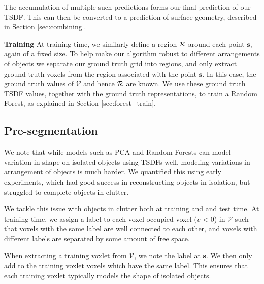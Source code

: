 \documentclass[10pt,twocolumn,letterpaper]{article}
\newcommand{\pixelidx}{\mathbf{s}}
\newcommand{\voxelgrid}{\mathcal{V}}
\newcommand{\voxel}{v}
\newcommand{\note}[1]{\textcolor{blue}{NOTE: #1}}
\renewcommand{\paragraph}{\vspace{2pt}\noindent\textbf}
\begin{document}
The accumulation of multiple such predictions forms our final prediction of our TSDF.
This can then be converted to a prediction of surface geometry, described in Section \ref{sec:combining}.



\paragraph{Training}
At training time, we similarly define a region $\mathcal{R}$ around each point $\pixelidx$, again of a fixed size.
To help make our algorithm robust to different arrangements of objects we separate our ground truth grid into regions, and only extract ground truth voxels from the region associated with the point $\pixelidx$.
In this case, the ground truth values of $\voxelgrid$ and hence $\mathcal{R}$ are known.
We use these ground truth TSDF values, together with the ground truth representations, to train a Random Forest, as explained in  Section \ref{sec:forest_train}.


\subsection{Pre-segmentation}

We note that while models such as PCA and Random Forests can model variation in shape on isolated objects using TSDFs well, modeling variations in arrangement of objects is much harder.
We quantified this using early experiments, which had good success in reconstructing objects in isolation, but struggled to complete objects in clutter.

We tackle this issue with objects in clutter both at training and and test time.
At training time, we assign a label to each voxel occupied voxel ($\voxel$ < 0) in $\voxelgrid$ such that  voxels with the same label are well connected to each other, and voxels with different labels are separated by some amount of free space.

When extracting a training voxlet from $\voxelgrid$, we note the label at $\pixelidx$.
We then only add to the training voxlet voxels which have the same label.
This ensures that each training voxlet typically models the shape of isolated objects.
\end{document}
